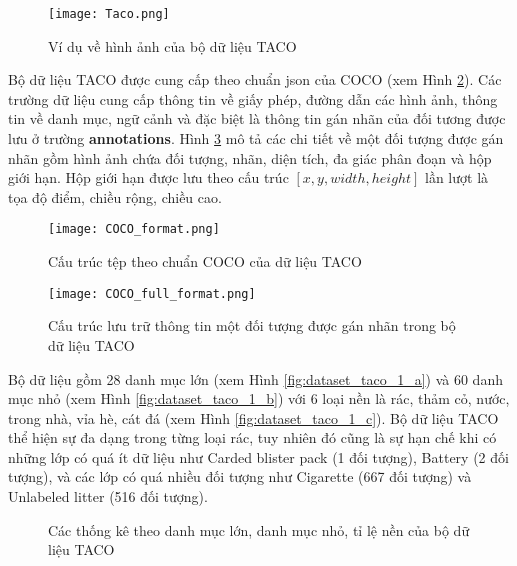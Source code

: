 \documentclass[../the.tex]{subfiles}
\begin{document}
\begin{figure}[H]
	\centering
	\texttt{[image: Taco.png]}
	\caption{Ví dụ về hình ảnh của bộ dữ liệu TACO \cite{proença2020taco}}
	\label{fig:dataset_taco}
\end{figure}


{\fontsize{13}{12} \selectfont
Bộ dữ liệu TACO được cung cấp theo chuẩn json của COCO (xem Hình \ref{fig:coco_full_format}).
Các trường dữ liệu cung cấp thông tin về giấy phép, đường dẫn các hình ảnh, thông tin về danh mục, ngữ cảnh và đặc biệt là thông tin gán nhãn của đối tương được lưu ở trường \textbf{annotations}.
Hình \ref{fig:taco_format} mô tả các chi tiết về một đối tượng được gán nhãn gồm hình ảnh chứa đối tượng, nhãn, diện tích, đa giác phân đoạn và hộp giới hạn. Hộp giới hạn được lưu theo cấu trúc $[x,y,width,height]$ lần lượt là tọa độ điểm, chiều rộng, chiều cao.

}

\begin{figure}[H]
	\centering
	\texttt{[image: COCO\_format.png]}
	\caption{Cấu trúc tệp theo chuẩn COCO của dữ liệu TACO}
	\label{fig:coco_full_format}
\end{figure}

\begin{figure}[H]
	\centering
	\texttt{[image: COCO\_full\_format.png]}
	\caption{Cấu trúc lưu trữ thông tin một đối tượng được gán nhãn trong bộ dữ liệu TACO}
	\label{fig:taco_format}
\end{figure}

{\fontsize{13}{12} \selectfont

Bộ dữ liệu gồm 28 danh mục lớn  (xem Hình \ref{fig:dataset_taco_1_a}) và 60 danh mục nhỏ (xem Hình \ref{fig:dataset_taco_1_b}) với
6 loại nền là rác, thảm cỏ, nước, trong nhà, vỉa hè, cát đá (xem Hình \ref{fig:dataset_taco_1_c}). Bộ dữ liệu TACO thể hiện sự đa dạng trong từng loại rác,
tuy nhiên đó cũng là sự hạn chế khi có những lớp có quá ít dữ liệu như Carded blister pack (1 đối tượng), Battery (2 đối tượng), và các lớp có quá nhiều đối tượng như Cigarette (667 đối tượng) và Unlabeled litter (516 đối tượng).

}

\begin{figure}[H]
	\centering
	\qquad
	\qquad
	\caption{Các thống kê theo danh mục lớn, danh mục nhỏ, tỉ lệ nền của bộ dữ liệu TACO}%
	\label{fig:dataset_taco_1}
\end{figure}
\end{document}
